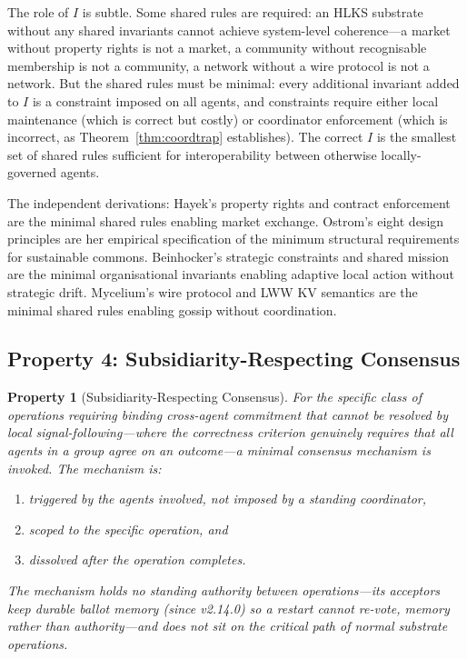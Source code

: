 \documentclass[11pt]{article}
\theoremstyle{definition}
\theoremstyle{plain}
\theoremstyle{plain}
\newtheorem*{property}{Property}
\begin{document}
The role of $I$ is subtle. Some shared rules are required: an HLKS substrate
without any shared invariants cannot achieve system-level coherence---a
market without property rights is not a market, a community without
recognisable membership is not a community, a network without a wire protocol
is not a network. But the shared rules must be minimal: every additional
invariant added to $I$ is a constraint imposed on all agents, and constraints
require either local maintenance (which is correct but costly) or coordinator
enforcement (which is incorrect, as Theorem~\ref{thm:coordtrap} establishes).
The correct $I$ is the smallest set of shared rules sufficient for
interoperability between otherwise locally-governed agents.

The independent derivations: Hayek's property rights and contract enforcement
are the minimal shared rules enabling market exchange. Ostrom's eight design
principles are her empirical specification of the minimum structural
requirements for sustainable commons. Beinhocker's strategic constraints and
shared mission are the minimal organisational invariants enabling adaptive
local action without strategic drift. Mycelium's wire protocol and LWW KV
semantics are the minimal shared rules enabling gossip without coordination.

\subsection{Property 4: Subsidiarity-Respecting Consensus}

\begin{property}[Subsidiarity-Respecting Consensus]
For the specific class of operations requiring binding cross-agent commitment
that cannot be resolved by local signal-following---where the correctness
criterion genuinely requires that all agents in a group agree on an
outcome---a minimal consensus mechanism is invoked. The mechanism is:
\begin{enumerate}[label=(\alph*)]
\item triggered by the agents involved, not imposed by a standing coordinator,
\item scoped to the specific operation, and
\item dissolved after the operation completes.
\end{enumerate}
The mechanism holds no standing authority between operations---its acceptors keep
durable ballot memory (since v2.14.0) so a restart cannot re-vote, memory rather
than authority---and does not sit on the critical path of normal substrate operations.
\end{property}
\end{document}
